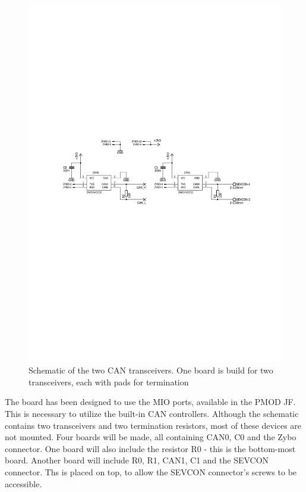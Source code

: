 \begin{figure}[h!]
	\centering
	\includegraphics[width = \linewidth]{graphics/CAN_Schematic}
	\caption{Schematic of the two CAN transceivers. One board is build for two transceivers, each with pads for termination}
	\label{fig:CAN_Schematic}
\end{figure}

The board has been designed to use the MIO ports, available in the PMOD JF. 
This is necessary to utilize the built-in CAN controllers.
Although the schematic contains two transceivers and two termination resistors, most of these devices are not mounted. 
Four boards will be made, all containing CAN0, C0 and the Zybo connector. 
One board will also include the resistor R0 - this is the bottom-most board.
Another board will include R0, R1, CAN1, C1 and the SEVCON connector.
Ths is placed on top, to allow the SEVCON connector's screws to be accessible. 

